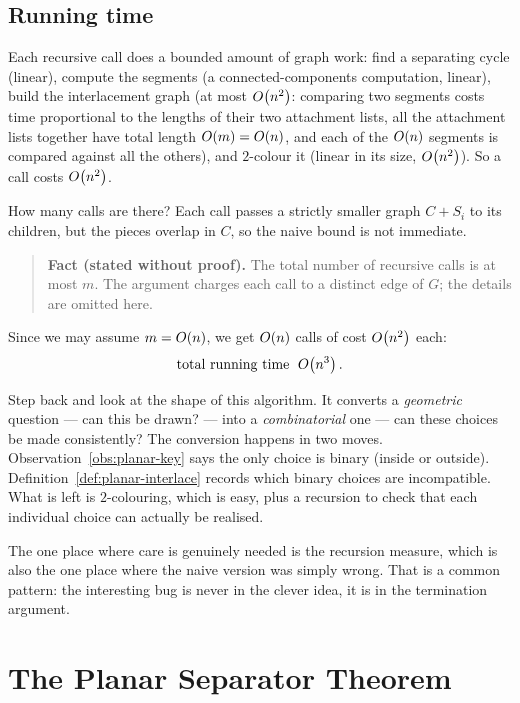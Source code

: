 \subsection{Running time}

Each recursive call does a bounded amount of graph work: find a separating
cycle (linear), compute the segments (a connected-components computation,
linear), build the interlacement graph (at most $O\!\left(n^2\right)$: comparing two segments
costs time proportional to the lengths of their two attachment lists, all the
attachment lists together have total length $O\!\left(m\right) = O\!\left(n\right)$, and each
of the $O\!\left(n\right)$ segments is compared against all the others), and $2$-colour it (linear in its size, $O\!\left(n^2\right)$). So a call
costs $O\!\left(n^2\right)$.

How many calls are there? Each call passes a strictly smaller graph
$C + S_i$ to its children, but the pieces overlap in $C$, so the naive bound
is not immediate.

\begin{quote}
\textbf{Fact (stated without proof).} The total number of recursive calls is
at most $m$. The argument charges each call to a distinct edge of $G$; the
details are omitted here.
\end{quote}

Since we may assume $m = O\!\left(n\right)$, we get $O\!\left(n\right)$ calls of cost
$O\!\left(n^2\right)$ each:
\[
  \text{total running time } \; O\!\left(n^3\right).
\]

\begin{intuition}
Step back and look at the shape of this algorithm. It converts a
\emph{geometric} question --- can this be drawn? --- into a
\emph{combinatorial} one --- can these choices be made consistently? The
conversion happens in two moves. Observation~\ref{obs:planar-key} says the only choice
is binary (inside or outside). Definition~\ref{def:planar-interlace} records which
binary choices are incompatible. What is left is $2$-colouring, which is easy,
plus a recursion to check that each individual choice can actually be realised.

The one place where care is genuinely needed is the recursion measure, which is
also the one place where the naive version was simply wrong. That is a common
pattern: the interesting bug is never in the clever idea, it is in the
termination argument.
\end{intuition}

\section{The Planar Separator Theorem}\label{sec:planar-pst}

